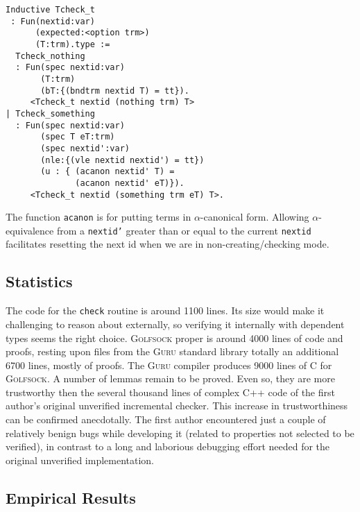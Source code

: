 \documentclass[preprint,natbib]{sigplanconf}
\begin{document}
\begin{verbatim}
Inductive Tcheck_t
 : Fun(nextid:var)
      (expected:<option trm>)
      (T:trm).type :=
  Tcheck_nothing
  : Fun(spec nextid:var)
       (T:trm)
       (bT:{(bndtrm nextid T) = tt}).
     <Tcheck_t nextid (nothing trm) T>
| Tcheck_something
  : Fun(spec nextid:var)
       (spec T eT:trm)
       (spec nextid':var)
       (nle:{(vle nextid nextid') = tt})
       (u : { (acanon nextid' T) =
              (acanon nextid' eT)}).
     <Tcheck_t nextid (something trm eT) T>.
\end{verbatim}

\noindent The function \texttt{acanon} is for putting terms in
$\alpha$-canonical form.  Allowing $\alpha$-equivalence from a
\texttt{nextid'} greater than or equal to the current \texttt{nextid}
facilitates resetting the next id when we are in non-creating/checking
mode.

\subsection{Statistics}

The code for the \texttt{check} routine is around 1100 lines.  Its
size would make it challenging to reason about externally, so
verifying it internally with dependent types seems the right choice.
\textsc{Golfsock} proper is around 4000 lines of code and proofs,
resting upon files from the \textsc{Guru} standard library totally an
additional 6700 lines, mostly of proofs.  The \textsc{Guru} compiler
produces 9000 lines of C for \textsc{Golfsock}.  A number of lemmas
remain to be proved.  Even so, they are more trustworthy then the
several thousand lines of complex C++ code of the first author's
original unverified incremental checker. This increase in
trustworthiness can be confirmed anecdotally.  The first author
encountered just a couple of relatively benign bugs while developing
it (related to properties not selected to be verified), in contrast to
a long and laborious debugging effort needed for the original
unverified implementation.

\subsection{Empirical Results}
\end{document}
